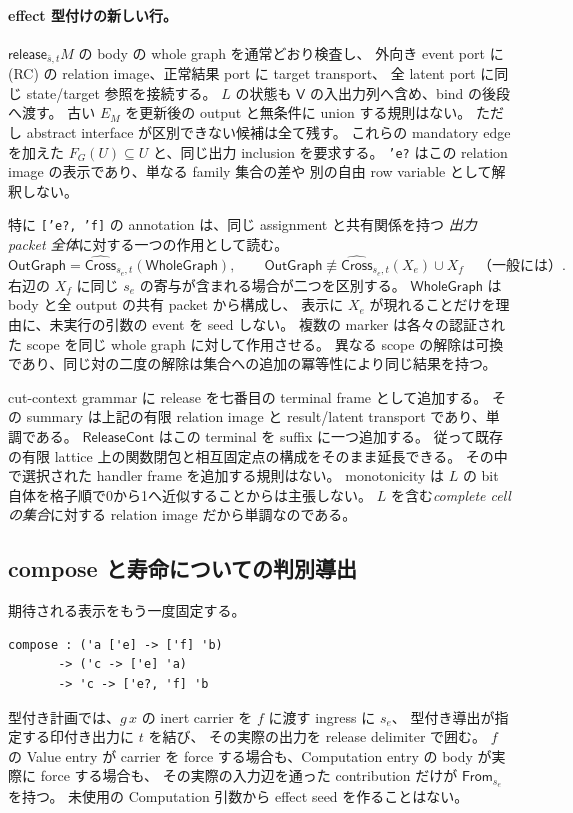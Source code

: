 \documentclass[11pt,a4paper]{article}
\begin{document}
\paragraph{effect 型付けの新しい行。}
\(\mathsf{release}_{\bar s,t}M\) の body の whole graph を通常どおり検査し、
外向き event port に (RC) の relation image、正常結果 port に target transport、
全 latent port に同じ state/target 参照を接続する。
\(L\) の状態も \(\mathsf V\) の入出力列へ含め、bind の後段へ渡す。
古い \(E_M\) を更新後の output と無条件に union する規則はない。
ただし abstract interface が区別できない候補は全て残す。
これらの mandatory edge を加えた \(F_G(U)\subseteq U\) と、同じ出力 inclusion を要求する。
\texttt{'e?} はこの relation image の表示であり、単なる family 集合の差や
別の自由 row variable として解釈しない。

特に \texttt{['e?, 'f]} の annotation は、同じ assignment と共有関係を持つ
\emph{出力 packet 全体}に対する一つの作用として読む。
\[
 \mathsf{OutGraph}=\widehat{\mathsf{Cross}}_{s_e,t}(\mathsf{WholeGraph}),
 \qquad
 \mathsf{OutGraph}\not\equiv
       \widehat{\mathsf{Cross}}_{s_e,t}(X_e)\cup X_f
 \quad\text{（一般には）}.
\]
右辺の \(X_f\) に同じ \(s_e\) の寄与が含まれる場合が二つを区別する。
\(\mathsf{WholeGraph}\) は body と全 output の共有 packet から構成し、
表示に \(X_e\) が現れることだけを理由に、未実行の引数の event を seed しない。
複数の marker は各々の認証された scope を同じ whole graph に対して作用させる。
異なる scope の解除は可換であり、同じ対の二度の解除は集合への追加の冪等性により同じ結果を持つ。

cut-context grammar に release を七番目の terminal frame として追加する。
その summary は上記の有限 relation image と result/latent transport であり、単調である。
\(\mathsf{ReleaseCont}\) はこの terminal を suffix に一つ追加する。
従って既存の有限 lattice 上の関数閉包と相互固定点の構成をそのまま延長できる。
その中で選択された handler frame を追加する規則はない。
monotonicity は \(L\) の bit 自体を格子順で0から1へ近似することからは主張しない。
\(L\) を含む\emph{complete cell の集合}に対する relation image だから単調なのである。

\subsection{compose と寿命についての判別導出}

期待される表示をもう一度固定する。
\begin{Verbatim}[fontsize=\small]
compose : ('a ['e] -> ['f] 'b)
       -> ('c -> ['e] 'a)
       -> 'c -> ['e?, 'f] 'b
\end{Verbatim}
型付き計画では、\(g\,x\) の inert carrier を \(f\) に渡す ingress に \(s_e\)、
型付き導出が指定する印付き出力に \(t\) を結び、
その実際の出力を release delimiter で囲む。
\(f\) の Value entry が carrier を force する場合も、Computation entry の body が実際に force する場合も、
その実際の入力辺を通った contribution だけが \(\mathsf{From}_{s_e}\) を持つ。
未使用の Computation 引数から effect seed を作ることはない。
\end{document}
